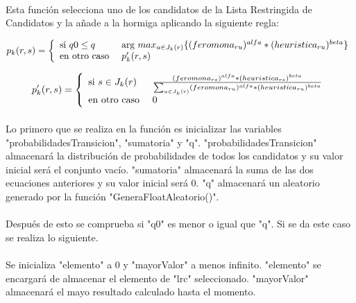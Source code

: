 	\paragraph{}Esta función selecciona uno de los candidatos de la Lista Restringida de Candidatos y la añade a la hormiga aplicando la siguiente regla:

	\begin{equation}
	p_{k}(r,s)= \left\lbrace
	\begin{array}{ll}
	\textup{si } q0 \leq q & \textup{arg }max_{u \in J_{k}(r)}\{(feromona_{ru})^{alfa}*(heuristica_{ru})^{beta}\}\\
	\textup{en otro caso } & p'_{k}(r,s)
	\end{array}
	\right.
	\end{equation}

	\begin{equation}
	p'_{k}(r,s)= \left\lbrace
	\begin{array}{ll}
	\textup{si } s \in J_{k}(r) & \frac{(feromona_{rs})^{alfa}*(heuristica_{rs})^{beta}}{\sum_{u \in J_{k}(r)}(feromona_{ru})^{alfa}*(heuristica_{ru})^{beta}}\\
	\textup{en otro caso } & 0
	\end{array}
	\right.
	\end{equation}
	
	\paragraph{}Lo primero que se realiza en la función es inicializar las variables "probabilidadesTransicion", "sumatoria" y "q". "probabilidadesTransicion" almacenará la distribución de probabilidades de todos los candidatos y su valor inicial será el conjunto vacío. "sumatoria" almacenará la suma de las dos ecuaciones anteriores y su valor inicial será 0. "q" almacenará un aleatorio generado por la función "GeneraFloatAleatorio()".
	
	\paragraph{}Después de esto se comprueba si "q0" es menor o igual que "q". Si se da este caso se realiza lo siguiente.
	
	\paragraph{}Se inicializa "elemento" a 0 y "mayorValor" a menos infinito. "elemento" se encargará de almacenar el elemento de "lrc" seleccionado. "mayorValor" almacenará el mayo resultado calculado hasta el momento.
	
